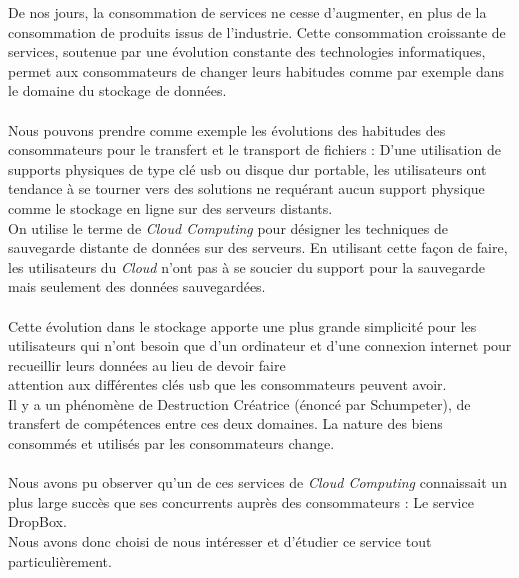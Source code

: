 \documentclass[a4paper, 10pt]{article}
\begin{document}
De nos jours, la consommation de services ne cesse d'augmenter, en plus de la consommation de produits issus de l'industrie.
Cette consommation croissante de services, soutenue par une évolution constante des technologies informatiques, permet aux consommateurs
de changer leurs habitudes comme par exemple dans le domaine du stockage de données.\\ \\
Nous pouvons prendre comme exemple les évolutions des habitudes des consommateurs pour le transfert et le transport de fichiers :
D'une utilisation de supports physiques de type clé usb ou disque dur portable, les utilisateurs ont tendance à se tourner vers des solutions
ne requérant aucun support physique comme le stockage en ligne sur des serveurs distants.\\
On utilise le terme de \textit{Cloud Computing} pour désigner les techniques de sauvegarde distante de données sur des serveurs.
En utilisant cette façon de faire, les utilisateurs du \textit{Cloud} n'ont pas à se soucier du support pour la sauvegarde mais
seulement des donn\'ees sauvegardées.\\ \\
Cette évolution dans le stockage apporte une plus grande simplicité pour les utilisateurs
qui n'ont besoin que d'un ordinateur et d'une connexion internet pour recueillir leurs données
au lieu de devoir faire\\attention aux différentes clés usb que les consommateurs peuvent avoir.\\
Il y a un phénomène de Destruction Créatrice (énoncé par Schumpeter), de transfert de compétences entre ces deux domaines.
La nature des biens consommés et utilisés par les consommateurs change.\\ \\
Nous avons pu observer qu'un de ces services de \textit{Cloud Computing} connaissait un plus large succès
que ses concurrents auprès des consommateurs : Le service DropBox.\\
Nous avons donc choisi de nous intéresser et d'étudier ce service tout particulièrement.
\newpage
\end{document}
